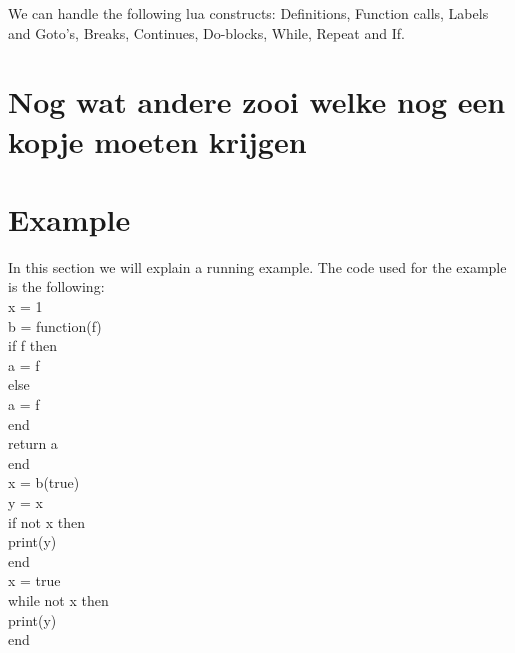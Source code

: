 \documentclass[10pt]{article}
\begin{document}
We can handle the following lua constructs: Definitions, Function calls, Labels and Goto's, Breaks, Continues, Do-blocks, While, Repeat and If.

\section{Nog wat andere zooi welke nog een kopje moeten krijgen}

\section{Example}
In this section we will explain a running example. The code used for the example is the following:\\

x = 1\\
b = function(f)\\
if f then\\
a = f\\
else \\
a = f\\
end\\
return a\\
end\\
x = b(true)\\
y = x\\
if not x then\\
print(y)\\
end\\
x = true\\
while not x then\\
print(y)\\
end\\
\end{document}
